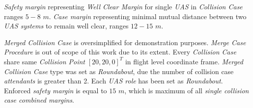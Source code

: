     \emph{Safety margin} representing \emph{Well Clear Margin} for single \emph{UAS} in \emph{Collision Case} ranges $5-8$ $m$. \emph{Case margin} representing minimal mutual distance between two \emph{UAS systems} to remain well clear, ranges $12-15$ $m$.
    
    \emph{Merged Collision Case} is oversimplified for demonstration purposes. \emph{Merge Case Procedure} is out of scope of this work due to its extent. Every \emph{Collision Case} share same \emph{Collision Point} $[20,20,0]^T$ in flight level coordinate frame. \emph{Merged Collision Case} type was set as \emph{Roundabout}, due the number of collision case \emph{attendants} is greater than 2. Each \emph{UAS role} has been set as \emph{Roundabout}. Enforced \emph{safety margin} is equal to $15$ $m$, which is maximum of all \emph{single collision case combined margins}.
    
